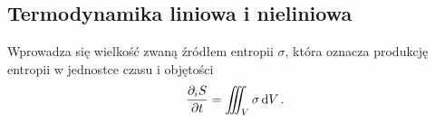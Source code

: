 \documentclass[10pt, a4paper, twoside, onecolumn]{article}
\numberwithin{equation}{section}
\newcommand{\dbar}{d\hspace*{-0.08em}\bar{}\hspace*{0.1em}}
\begin{document}
	
	
	
	\subsection{Termodynamika liniowa i nieliniowa}
	Wprowadza się wielkość zwaną źródłem entropii \(\sigma\), która oznacza produkcję entropii w jednostce czasu i objętości
	\begin{equation}
		\pdv{_{i}S}{t} = \iiint_{V}\sigma\dd{V}.
	\end{equation}
	
\end{document}
